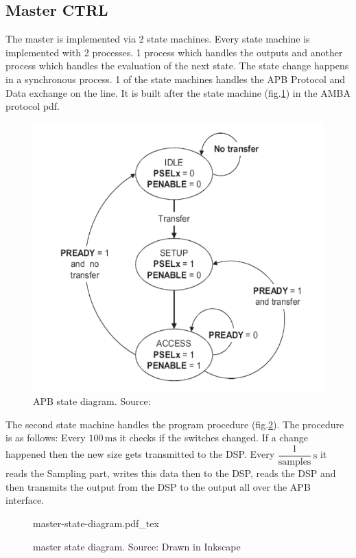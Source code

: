 \documentclass[%
	a4paper,
]
{article}
\newcommand{\incfig}[2]{%
    \def\svgscale{#2}
    {#1.pdf_tex}
}
\begin{document}
\subsection{Master CTRL}
The master is implemented via 2 state machines. 
Every state machine is implemented with 2 processes. 1 process
which handles the outputs and another process which handles
the evaluation of the next state. The state change happens in
a synchronous process.
1 of the state
machines handles the APB Protocol and Data exchange on the line. 
It is built after the state machine (fig.\ref{fig:apb-state}) in the AMBA protocol pdf.

\begin{figure}[ht]
    \centering
    \includegraphics[scale=0.3]{fig/apb-state-diag.png}
    \caption{APB state diagram. Source:\protect\autocite{apb}}
    \label{fig:apb-state}
\end{figure}

The second state machine handles the program procedure (fig.\ref{fig:mst-state}). The 
procedure is as follows: Every $100\,\text{ms}$ it checks if
the switches changed. If a change happened then the new size
gets transmitted to the DSP. Every 
$\dfrac{1}{\text{samples}}\,\text{s}$ it reads the
Sampling part, writes this data then to the DSP, reads the DSP
and then transmits the output from the DSP to the output all over the APB interface.

\begin{figure}[ht]
    \centering
    \incfig{master-state-diagram}{1.7}
    \caption{master state diagram. Source: Drawn in Inkscape}
    \label{fig:mst-state}
\end{figure}
\end{document}
